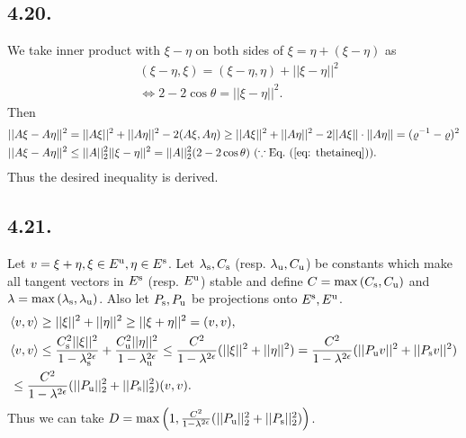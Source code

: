 \documentclass[a4paper,11pt,fleqn]{article}
\begin{document}
\subsection{4.20.}
We take inner product with $\xi-\eta$ on both sides of $\xi=\eta+(\xi-\eta)$ as 
\begin{align}
    &(\xi-\eta,\xi) = (\xi-\eta,\eta)+||\xi-\eta||^2 \nonumber \\
    &\Leftrightarrow 2-2\cos{\theta} = ||\xi-\eta||^2. \label{eq: thetaineq}
\end{align}
Then 
\begin{align}
    &||A\xi - A\eta||^2 = ||A\xi||^2+||A\eta||^2-2(A\xi,A\eta) \ge ||A\xi||^2+||A\eta||^2-2||A\xi||\cdot||A\eta|| = (\varrho^{-1}-\varrho)^2 \\
    &||A\xi - A\eta||^2 \le ||A||_2^2||\xi-\eta||^2=||A||_2^2(2-2\cos{\theta}) \ (\because \text{Eq.~}(\ref{eq: thetaineq})). 
\end{align}
Thus the desired inequality is derived. 
\hruleskip

\subsection{4.21.}
Let $v=\xi+\eta, \xi \in E^{\rm u}, \eta \in E^{\rm s}$. Let $\lambda_{\rm s}, C_{\rm s}$ (resp. $\lambda_{\rm u}, C_{\rm u}$) be constants which make all tangent vectors in $E^{\rm s}$ (resp. $E^{\rm u}$) stable and define $C = \max{(C_{\rm s},C_{\rm u})}$ and $\lambda = \max{(\lambda_{\rm s},\lambda_{\rm u})}$. Also let $P_{\rm s}, P_{\rm u}$ be projections onto $E^{\rm s}, E^{\rm u}$. 
\begin{align}
    &\langle v,v \rangle \ge ||\xi||^2 + ||\eta||^2 \ge ||\xi+\eta||^2 = (v,v), \\
    &\langle v,v \rangle \le \frac{C_{\rm s}^2||\xi||^2}{1-\lambda_{\rm s}^{2\epsilon}} + \frac{C_{\rm u}^2||\eta||^2}{1-\lambda_{\rm u}^{2\epsilon}} \le \frac{C^2}{1-\lambda^{2\epsilon}}(||\xi||^2 + ||\eta||^2) = \frac{C^2}{1-\lambda^{2\epsilon}}(||P_{\rm u}v||^2 + ||P_{\rm s}v||^2) \nonumber \\
    &\le \frac{C^2}{1-\lambda^{2\epsilon}}(||P_{\rm u}||_2^2 + ||P_{\rm s}||_2^2)(v,v). 
\end{align}
Thus we can take $D = \max{\left(1,\frac{C^2}{1-\lambda^{2\epsilon}}(||P_{\rm u}||_2^2 + ||P_{\rm s}||_2^2)\right)}$.
\hruleskip
\end{document}
